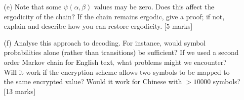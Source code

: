 \documentclass{article}
\begin{document}
\begin{enumerate}
    \item[(e)] Note that some \( \psi(\alpha, \beta) \) values may be zero. Does this affect the ergodicity of the chain? If the chain remains ergodic, give a proof; if not, explain and describe how you can restore ergodicity. [5 marks]

    \item[(f)] Analyse this approach to decoding. For instance, would symbol probabilities alone (rather than transitions) be sufficient? If we used a second order Markov chain for English text, what problems might we encounter? Will it work if the encryption scheme allows two symbols to be mapped to the same encrypted value? Would it work for Chinese with \( > 10000 \) symbols? [13 marks]

\end{enumerate}
    
    
\end{document}
